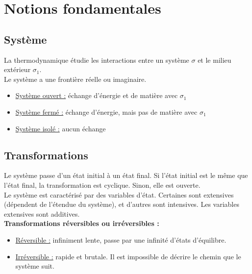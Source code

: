 \documentclass[13pt, twoside, a4paper, french]{report}
\begin{document}
        \section{Notions fondamentales}\label{sec:notions-fondamentales}

            \subsection{Système}\label{subsec:systeme}

                La thermodynamique étudie les interactions entre un système $\sigma$ et le milieu extérieur $\sigma_1$.\\
                Le système a une frontière réelle ou imaginaire.
                \vspace{5pt}
                \begin{itemize}
                    \item \underline{Système ouvert :} échange d'énergie et de matière avec $\sigma_1$
                    \item \underline{Système fermé :} échange d'énergie, mais pas de matière avec $\sigma_1$
                    \item \underline{Système isolé :} aucun échange
                \end{itemize}

            \subsection{Transformations}\label{subsec:transformations}

                Le système passe d'un état initial à un état final.
                Si l'état initial est le même que l'état final, la transformation est cyclique.
                Sinon, elle est ouverte.\\

                Le système est caractérisé par des variables d'état.
                Certaines sont extensives (dépendent de l'étendue du système), et d'autres sont intensives.
                Les variables extensives sont additives.\\

                \textbf{Transformations réversibles ou irréversibles :}
                \vspace{5pt}
                \begin{itemize}
                    \item \underline{Réversible :} infiniment lente, passe par une infinité d'états d'équilibre.
                    \item \underline{Irréversible :} rapide et brutale.
                    Il est impossible de décrire le chemin que le système suit.
                \end{itemize}
                \vspace{12pt}
\end{document}
